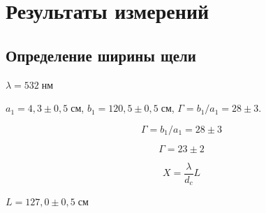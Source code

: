 \section{Результаты измерений}
\subsection{Определение ширины щели}

$\lambda = 532\;\text{нм}$

$a_{1} = 4{,}3 \pm 0{,}5 \; \text{см}$, $b_{1} = 120{,}5 \pm 0{,}5 \;\text{см}$, $\Gamma = b_{1} / a_{1} = 28 \pm 3$.

\[
    \Gamma = b_{1} / a_{1} = 28 \pm 3
\]



\begin{figure}[ht!]
\end{figure}

\[
\Gamma = 23 \pm 2
\]

\begin{figure}[ht!]
\end{figure}

\[
    X = \frac{\lambda}{d_{c}}L
\]

$L = 127{,}0 \pm 0{,}5 \;\text{см}$

